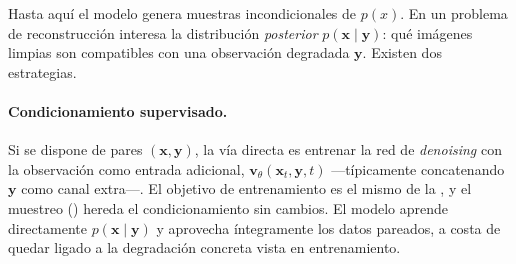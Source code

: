 Hasta aquí el modelo genera muestras incondicionales de $p(x)$. En
un problema de reconstrucción interesa la distribución
\emph{posterior} $p(\mathbf{x} \mid \mathbf{y})$: qué imágenes
limpias son compatibles con una observación degradada $\mathbf{y}$.
Existen dos estrategias.

\paragraph{Condicionamiento supervisado.}
Si se dispone de pares $(\mathbf{x}, \mathbf{y})$, la vía directa es
entrenar la red de \textit{denoising} con la observación como entrada
adicional, $\mathbf{v}_\theta(\mathbf{x}_t, \mathbf{y}, t)$
—típicamente concatenando $\mathbf{y}$ como canal extra—. El
objetivo de entrenamiento es el mismo de la , y el
muestreo () hereda el condicionamiento sin
cambios. El modelo aprende directamente
$p(\mathbf{x} \mid \mathbf{y})$ y aprovecha íntegramente los datos
pareados, a costa de quedar ligado a la degradación concreta vista en
entrenamiento.

